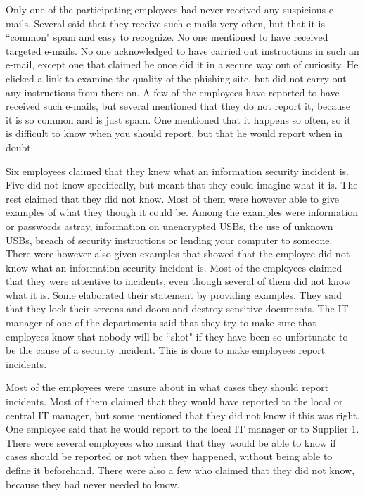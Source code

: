 Only one of the participating employees had never received any suspicious e-mails. Several said that they receive such e-mails very often, but that it is ``common" spam and easy to recognize. No one mentioned to have received targeted e-mails. No one acknowledged to have carried out instructions in such an e-mail, except one that claimed he once did it in a secure way out of curiosity. He clicked a link to examine the quality of the phishing-site, but did not carry out any instructions from there on. A few of the employees have reported to have received such e-mails, but several mentioned that they do not report it, because it is so common and is just spam. One mentioned that it happens so often, so it is difficult to know when you should report, but that he would report when in doubt.

Six employees claimed that they knew what an information security incident is. Five did not know specifically, but meant that they could imagine what it is. The rest claimed that they did not know. Most of them were however able to give examples of what they though it could be. Among the examples were information or passwords astray, information on unencrypted \acsp{USB}, the use of unknown \acsp{USB}, breach of security instructions or lending your computer to someone. There were however also given examples that showed that the employee did not know what an information security incident is. Most of the employees claimed that they were attentive to incidents, even though several of them did not know what it is. Some elaborated their statement by providing examples. They said that they lock their screens and doors and destroy sensitive documents. The IT manager of one of the departments said that they try to make sure that employees know that nobody will be ``shot" if they have been so unfortunate to be the cause of a security incident. This is done to make employees report incidents.

Most of the employees were unsure about in what cases they should report incidents. Most of them claimed that they would have reported to the local or central IT manager, but some mentioned that they did not know if this was right. One employee said that he would report to the local IT manager or to Supplier 1. There were several employees who meant that they would be able to know if cases should be reported or not when they happened, without being able to define it beforehand. There were also a few who claimed that they did not know, because they had never needed to know.

